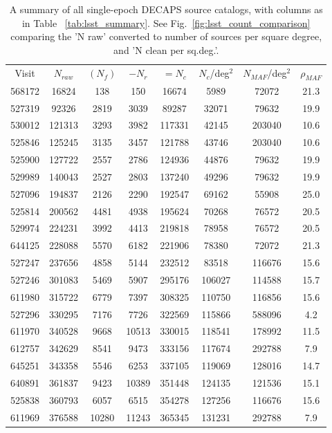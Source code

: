 \documentclass[DM,lsstdraft,toc,usenatbib]{lsstdoc}
\begin{document}
\begin{table}
\centering
\caption{A summary of all single-epoch DECAPS source catalogs, with columns as in  Table ~\ref{tab:lsst_summary}. See Fig.~\ref{fig:lsst_count_comparison} comparing the 'N raw' converted to number of sources per square degree, and  'N clean per sq.deg.'.  }
\label{tab:decaps_summary}
\begin{tabular}{cccccccc}
Visit & $N_{raw}$ & $(N_{f})$ & $-N_{r}$ & $=N_{c}$ & $N_{c}$/deg$^{2}$ & $N_{MAF}$/deg$^{2}$ & $\rho_{MAF}$ \\
568172 & 16824 & 138 & 150 & 16674 & 5989 & 72072 & 21.3 \\
527319 & 92326 & 2819 & 3039 & 89287 & 32071 & 79632 & 19.9 \\
530012 & 121313 & 3293 & 3982 & 117331 & 42145 & 203040 & 10.6 \\
525846 & 125245 & 3135 & 3457 & 121788 & 43746 & 203040 & 10.6 \\
525900 & 127722 & 2557 & 2786 & 124936 & 44876 & 79632 & 19.9 \\
529989 & 140043 & 2527 & 2803 & 137240 & 49296 & 79632 & 19.9 \\
527096 & 194837 & 2126 & 2290 & 192547 & 69162 & 55908 & 25.0 \\
525814 & 200562 & 4481 & 4938 & 195624 & 70268 & 76572 & 20.5 \\
529974 & 224231 & 3992 & 4413 & 219818 & 78958 & 76572 & 20.5 \\
644125 & 228088 & 5570 & 6182 & 221906 & 78380 & 72072 & 21.3 \\
527247 & 237656 & 4858 & 5144 & 232512 & 83518 & 116676 & 15.6 \\
527246 & 301083 & 5469 & 5907 & 295176 & 106027 & 114588 & 15.7 \\
611980 & 315722 & 6779 & 7397 & 308325 & 110750 & 116856 & 15.6 \\
527296 & 330295 & 7176 & 7726 & 322569 & 115866 & 588096 & 4.2 \\
611970 & 340528 & 9668 & 10513 & 330015 & 118541 & 178992 & 11.5 \\
612757 & 342629 & 8541 & 9473 & 333156 & 117674 & 292788 & 7.9 \\
645251 & 343358 & 5546 & 6253 & 337105 & 119069 & 128016 & 14.7 \\
640891 & 361837 & 9423 & 10389 & 351448 & 124135 & 121536 & 15.1 \\
525838 & 360793 & 6057 & 6515 & 354278 & 127256 & 116676 & 15.6 \\
611969 & 376588 & 10280 & 11243 & 365345 & 131231 & 292788 & 7.9 \\

\end{tabular}
\end{table}
\end{document}
